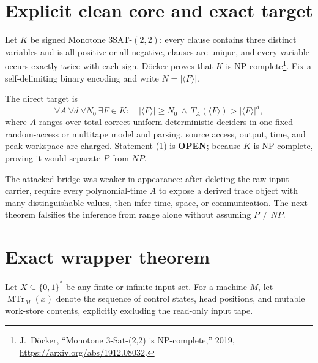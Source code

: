 \documentclass[11pt]{article}
\newcommand{\OPEN}{\textbf{OPEN}}
\begin{document}
\section{Explicit clean core and exact target}
Let $K$ be signed Monotone $3$SAT-$(2,2)$: every clause contains three
distinct variables and is all-positive or all-negative, clauses are unique,
and every variable occurs exactly twice with each sign.  D\"ocker proves that
$K$ is NP-complete\footnote{J.~D\"ocker, ``Monotone 3-Sat-(2,2) is
NP-complete,'' 2019, \url{https://arxiv.org/abs/1912.08032}.}.  Fix a
self-delimiting binary encoding and write $N=|\langle F\rangle|$.

The direct target is
\begin{equation}
 \forall A\ \forall d\ \forall N_0\ \exists F\in K:\quad
 |\langle F\rangle|\ge N_0\ \land\
 T_A(\langle F\rangle)>|\langle F\rangle|^d,              \tag{1}
\end{equation}
where $A$ ranges over total correct uniform deterministic deciders in one
fixed random-access or multitape model and parsing, source access, output,
time, and peak workspace are charged.  Statement (1) is \OPEN; because $K$ is
NP-complete, proving it would separate $P$ from $NP$.

The attacked bridge was weaker in appearance: after deleting the raw input
carrier, require every polynomial-time $A$ to expose a derived trace object
with many distinguishable values, then infer time, space, or communication.
The next theorem falsifies the inference from range alone without assuming
$P\ne NP$.

\section{Exact wrapper theorem}
Let $X\subseteq\{0,1\}^*$ be any finite or infinite input set.  For a machine
$M$, let $\operatorname{MTr}_M(x)$ denote the sequence of control states,
head positions, and mutable work-store contents, explicitly excluding the
read-only input tape.
\end{document}

